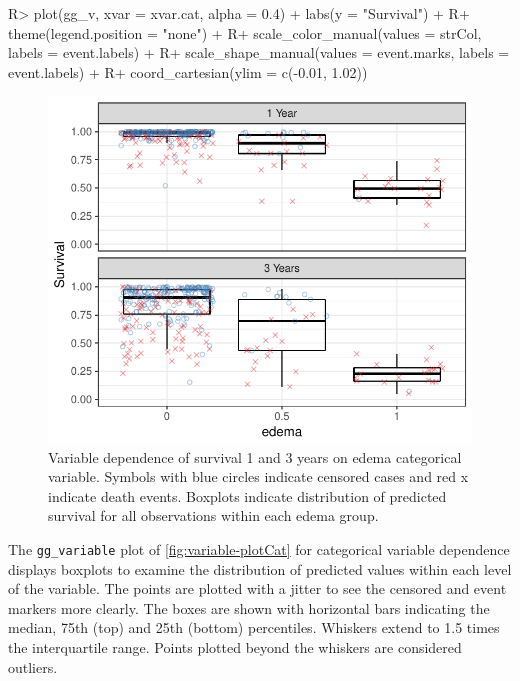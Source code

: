 \documentclass[article]{jss}
\begin{document}
\begin{Schunk}
\begin{Sinput}
R> plot(gg_v, xvar = xvar.cat, alpha = 0.4) + labs(y = "Survival") +
R+   theme(legend.position = "none") +
R+   scale_color_manual(values = strCol, labels = event.labels) +
R+   scale_shape_manual(values = event.marks, labels = event.labels) +
R+   coord_cartesian(ylim = c(-0.01, 1.02))
\end{Sinput}
\begin{figure}[!htb]

{\centering \includegraphics{rfs-variable-plotCat-1} 

}

\caption[Variable dependence of survival 1 and 3 years on edema categorical variable]{Variable dependence of survival 1 and 3 years on edema categorical variable. Symbols with blue circles indicate censored cases and red x indicate death events. Boxplots indicate distribution of predicted survival for all observations within each edema group.}\label{fig:variable-plotCat}
\end{figure}
\end{Schunk}

The \texttt{gg\_variable} plot of \autoref{fig:variable-plotCat} for
categorical variable dependence displays boxplots to examine the
distribution of predicted values within each level of the variable. The
points are plotted with a jitter to see the censored and event markers
more clearly. The boxes are shown with horizontal bars indicating the
median, 75th (top) and 25th (bottom) percentiles. Whiskers extend to 1.5
times the interquartile range. Points plotted beyond the whiskers are
considered outliers.
\end{document}
